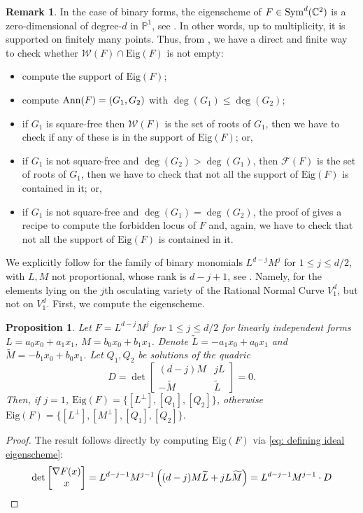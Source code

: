 \documentclass{amsart}
\numberwithin{theorem}{section}
\newtheorem{proposition}[theorem]{Proposition}
\theoremstyle{definition}
\newtheorem{remark}[theorem]{Remark}
\newcommand{\Eig}{\mathrm{Eig}}
\newcommand{\W}{\mathcal{W}}
\newcommand{\PP}{\mathbb{P}}
\newcommand{\CC}{\mathbb{C}}
\newcommand{\sym}{\mathop{\rm Sym}\nolimits}
\begin{document}
\begin{remark}\label{rmk:algo_binary}
    In the case of binary forms, the eigenscheme of $F \in \sym^d(\CC^2)$ is a zero-dimensional of degree-$d$ in $\PP^1$, see . In other words, up to multiplicity, it is supported on finitely many points. Thus, from \cite[Theorem 3.5]{carlini2017waring}, we have a direct and finite way to check whether $\W(F) \cap \Eig(F)$ is not empty:
    \begin{itemize}
        \item compute the support of $\Eig(F)$;
        \item compute ${\rm Ann}(F) = (G_1,G_2)$ with $\deg(G_1) \leq \deg(G_2)$;
        \item if $G_1$ is square-free then $\W(F)$ is the set of roots of $G_1$, then we have to check if any of these is in the support of $\Eig(F)$; or,
        \item if $G_1$ is not square-free and $\deg(G_2) > \deg(G_1)$, then $\mathcal{F}(F)$ is the set of roots of $G_1$, then we have to check that not all the support of $\Eig(F)$ is contained in it; or,
        \item if $G_1$ is not square-free and $\deg(G_1) = \deg(G_2)$, the proof of \cite[Theorem 3.5]{carlini2017waring} gives a recipe to compute the forbidden locus of $F$ and, again, we have to check that not all the support of $\Eig(F)$ is contained in it.
    \end{itemize}
\end{remark}
We explicitly follow  for the family of binary monomials $L^{d-j}M^j$ for $1 \leq j \leq d/2$, with $L,M$ not proportional, whose rank is $d-j+1$, see \cite{CCG12}. Namely, for the elements lying on the $j$th osculating variety of the Rational Normal Curve $V^d_1$, but not on $V^d_1$. First, we compute the eigenscheme.



\begin{proposition}\label{prop: osculante}
    Let $F=L^{d-j}M^j$ for $1\leq j\leq d/2$ for linearly independent forms $L=a_0x_0+a_1x_1$, $M=b_0x_0+b_1x_1$. Denote $\widetilde{L}=-a_1x_0+a_0x_1$ and $\widetilde{M}=-b_1x_0+b_0x_1$. Let $Q_1,Q_2$ be solutions of the quadric 
    \[
       D= \det \begin{bmatrix}
            (d-j)M & jL \\
            -\widetilde{M} & \widetilde{L}
        \end{bmatrix}=0.
    \]
    Then, if $j=1$, $\Eig(F)=\{[L^\perp], [Q_1],[Q_2]\}$, otherwise $\Eig(F)=\{[L^\perp],[M^\perp], [Q_1],[Q_2]\}$.  
\end{proposition}
\begin{proof}
The result follows directly by computing $\Eig(F)$ via \cref{eq: defining ideal eigenscheme}:
  \begin{equation*}
  \det\begin{bmatrix}
        \nabla F(x)\\
    x
    \end{bmatrix}=L^{d-j-1}M^{j-1}\left( (d-j)M\widetilde L+jL\widetilde M \right) = L^{d-j-1}M^{j-1} \cdot D       \qedhere
\end{equation*}
\end{proof}
\end{document}
